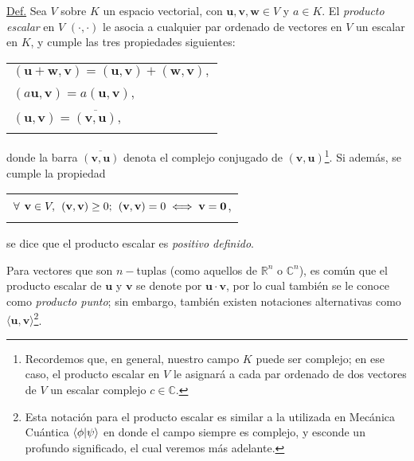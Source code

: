\documentclass[12pt]{article}
\begin{document}
\begin{tcolorbox}
\underline{Def.} Sea $V$ sobre $K$ un espacio vectorial, con $\mathbf{u},\mathbf{v},\mathbf{w}\in V$ y $a\in K$. El \textit{producto escalar} en $V$ $(\cdot\mathop ,\cdot)$ le asocia a cualquier par ordenado de vectores en $V$ un escalar en $K$, y cumple las tres propiedades siguientes:

\begin{tabular}{l}
    \\
    $(\mathbf{u}+\mathbf{w},\mathbf{v}) = (\mathbf{u},\mathbf{v})+(\mathbf{w},\mathbf{v}),$ \\ \\ $(a\mathbf{u},\mathbf{v}) = a(\mathbf{u},\mathbf{v}),$ \\ \\
    $(\mathbf{u},\mathbf{v})=\overline{(\mathbf{v},\mathbf{u})},$ \\ \\
\end{tabular}

donde la barra $\overline{(\mathbf{v},\mathbf{u})}$ denota el complejo conjugado de $(\mathbf{v},\mathbf{u})$\footnote{Recordemos que, en general, nuestro campo $K$ puede ser complejo; en ese caso, el producto escalar en $V$ le asignará a cada par ordenado de dos vectores de $V$ un escalar complejo $c\in\mathbb{C}$.}. Si además, se cumple la propiedad

\begin{tabular}{l}
    \\
    $\forall\hspace{1.5mm}\mathbf{v}\in V, \hspace{1.5mm} (\mathbf{v},\mathbf{v})\geq0; \hspace{1.5mm} (\mathbf{v},\mathbf{v}) = 0 \iff \mathbf{v}=\mathbf{0}$, \\ \\
\end{tabular}

se dice que el producto escalar es \textit{positivo definido}.

\vspace{3mm}
\hspace{2.5mm} Para vectores que son $n-$tuplas (como aquellos de $\mathbb{R}^n$ o $\mathbb{C}^n$), es común que el producto escalar de $\mathbf{u}$ y $\mathbf{v}$ se denote por $\mathbf{u}\cdot\mathbf{v}$, por lo cual también se le conoce como \textit{producto punto}; sin embargo, también existen notaciones alternativas como $\langle \mathbf{u}, \mathbf{v}\rangle$\footnote{Esta notación para el producto escalar es similar a la utilizada en Mecánica Cuántica $\braket{\phi|\psi}$ \textemdash en donde el campo siempre es complejo\textemdash, y esconde un profundo significado, el cual veremos más adelante.}.

\end{tcolorbox}{}
\end{document}
